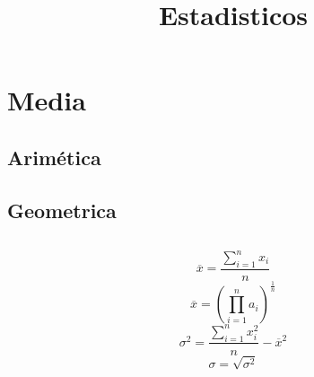 
\title{Estadisticos}


\section{Media}
\subsection{Arimética}
\subsection{Geometrica}
\subsection{}
\begin{equation}
    \overline{x} = \dfrac{\sum\limits_{i=1}^n{x_i}}{n}
\end{equation}
\begin{equation}
    \overline{x} = (\prod\limits_{i=1}^n{a_i})^{\frac{1}{n}}
\end{equation}
\begin{equation}
    \sigma^2 = \dfrac{\sum\limits_{i=1}^n{x^2_i}}{n}-\overline{x}^2
\end{equation}
\begin{equation}
    \sigma = \sqrt{\sigma^2}
\end{equation}
